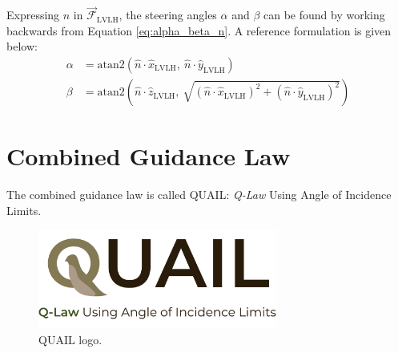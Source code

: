 Expressing \(\hat{n}\) in \(\vec{\mathcal{F}}_{\text{LVLH}}\), the steering angles \(\alpha\) and \(\beta\) can be found by working backwards from Equation \ref{eq:alpha_beta_n}. A reference formulation is given below:
\begin{align*}
  \alpha & = \mathrm{atan2}\left(\hat{n} \cdot \hat{x}_{\text{LVLH}}, \ \hat{n} \cdot \hat{y}_{\text{LVLH}}\right)                                                      \\
  \beta  & = \mathrm{atan2}\left(\hat{n} \cdot \hat{z}_{\text{LVLH}}, \ \sqrt{(\hat{n} \cdot \hat{x}_{\text{LVLH}})^2 + (\hat{n} \cdot \hat{y}_{\text{LVLH}})^2}\right)
\end{align*}

\section{Combined Guidance Law}
The combined guidance law is called QUAIL: \textit{Q-Law} Using Angle of Incidence Limits.

\begin{figure}[H]
  \centering
  \includegraphics[width=0.7\textwidth]{figures/quail_logo_v2.pdf}
  \caption{QUAIL logo.}
  \label{fig:quail_logo}
\end{figure}


